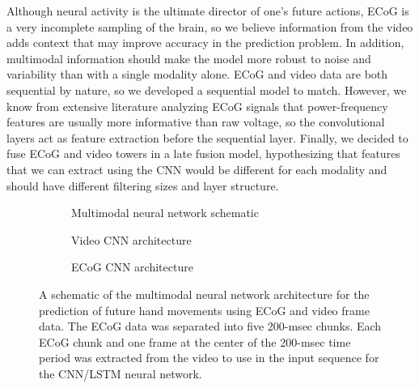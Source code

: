 \documentclass[letterpaper]{article} %
\begin{document}
Although neural activity is the ultimate director of one's future actions, ECoG is a very incomplete sampling of the brain, so we believe information from the video adds context that may improve accuracy in the prediction problem.
In addition, multimodal information should make the model more robust to noise and variability than with a single modality alone. 
ECoG and video data are both sequential by nature, so we developed a sequential model to match. 
However, we know from extensive literature analyzing ECoG signals that power-frequency features are usually more informative than raw voltage, so the convolutional layers act as feature extraction before the sequential layer.
Finally, we decided to fuse ECoG and video towers in a late fusion model, hypothesizing that features that we can extract using the CNN would be different for each modality and should have different filtering sizes and layer structure. 


\begin{figure}[h!]
\begin{subfigure}{0.47\textwidth}
\caption{Multimodal neural network schematic}
\end{subfigure}

\begin{subfigure}{0.47\textwidth}
\caption{Video CNN architecture}
\end{subfigure}

\begin{subfigure}{0.47\textwidth}
\caption{ECoG CNN architecture}
\end{subfigure}


\caption{A schematic of the multimodal neural network architecture for the prediction of future hand movements using ECoG and video frame data. The ECoG data was separated into five 200-msec chunks. Each ECoG chunk and one frame at the center of the 200-msec time period was extracted from the video to use in the input sequence for the CNN/LSTM neural network.
\label{fig:architecture}}
\end{figure}





\end{document}
